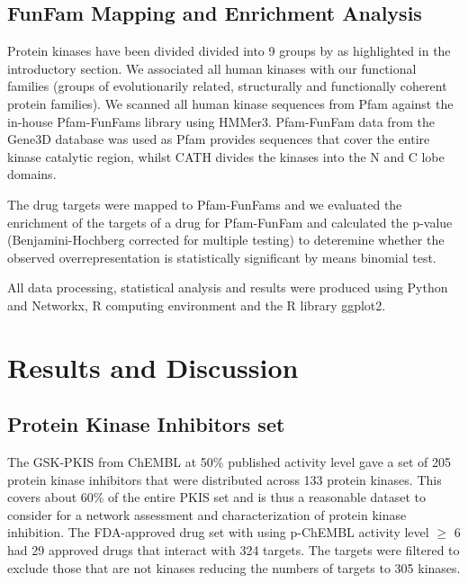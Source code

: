\documentclass[a4paper, 11pt]{report}
\begin{document}
\subsection{FunFam Mapping and Enrichment Analysis}
Protein kinases have been divided divided into 9 groups by \cite{manning2002protein} as highlighted in the introductory section. We associated all human kinases with our functional families (groups of evolutionarily related, structurally and functionally coherent protein families). We scanned all human kinase sequences from Pfam against the in-house Pfam-FunFams library using HMMer3. Pfam-FunFam data from the Gene3D database was used as Pfam provides sequences that cover the entire kinase catalytic region, whilst CATH divides the kinases into the N and C lobe domains.\par
The drug targets were mapped to Pfam-FunFams and we evaluated the enrichment of the targets of a drug for Pfam-FunFam and calculated the p-value (Benjamini-Hochberg corrected for multiple testing) to deteremine whether the observed overrepresentation is statistically significant by means binomial test.\par
All data processing, statistical analysis and results were produced using Python and Networkx, R computing environment and the R library ggplot2.
\newpage
\section{Results and Discussion}
\subsection{Protein Kinase Inhibitors set}
The GSK-PKIS from ChEMBL at 50\% published activity level gave a set of 205 protein kinase inhibitors that were distributed across 133 protein kinases. This covers about 60\% of the entire PKIS set and is thus a reasonable dataset to consider for a network assessment and characterization of protein kinase inhibition. The FDA-approved drug set with using p-ChEMBL activity level $\geq$ 6 had 29 approved drugs that interact with 324 targets. The targets were filtered to exclude those that are not kinases reducing the numbers of targets to 305 kinases. 
\end{document}
